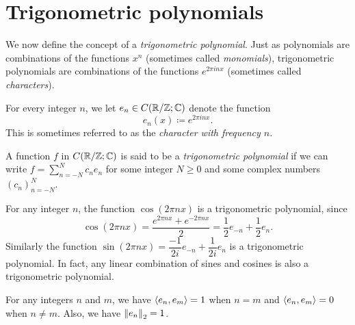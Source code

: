 \section{Trigonometric polynomials}\label{sec:5.3}

\begin{note}
  We now define the concept of a \emph{trigonometric polynomial}.
  Just as polynomials are combinations of the functions \(x^n\) (sometimes called \emph{monomials}), trigonometric polynomials are combinations of the functions \(e^{2 \pi i n x}\) (sometimes called \emph{characters}).
\end{note}

\begin{defn}[Characters]\label{5.3.1}
  For every integer \(n\), we let \(e_n \in C(\R / \Z ; \C)\) denote the function
  \[
    e_n(x) \coloneqq e^{2 \pi i n x}.
  \]
  This is sometimes referred to as the \emph{character with frequency \(n\)}.
\end{defn}

\begin{defn}\label{5.3.2}
  A function \(f\) in \(C(\R / \Z ; \C)\) is said to be a \emph{trigonometric polynomial} if we can write
  \(f = \sum_{n = -N}^N c_n e_n\) for some integer \(N \geq 0\) and some complex numbers \((c_n)_{n = -N}^N\).
\end{defn}

\setcounter{thm}{3}
\begin{eg}\label{5.3.4}
  For any integer \(n\), the function \(\cos(2 \pi n x)\) is a trigonometric polynomial, since
  \[
    \cos(2 \pi n x) = \dfrac{e^{2 \pi n x} + e^{- 2 \pi n x}}{2} = \dfrac{1}{2} e_{-n} + \dfrac{1}{2} e_n.
  \]
  Similarly the function \(\sin(2 \pi n x) = \dfrac{-1}{2i} e_{-n} + \dfrac{1}{2i} e_n\) is a trigonometric polynomial.
  In fact, any linear combination of sines and cosines is also a trigonometric polynomial.
\end{eg}

\begin{lem}\label{5.3.5}
  For any integers \(n\) and \(m\), we have \(\inner*{e_n, e_m} = 1\) when \(n = m\) and \(\inner*{e_n, e_m} = 0\) when \(n \neq m\).
  Also, we have \(\norm*{e_n}_2 = 1\).
\end{lem}

